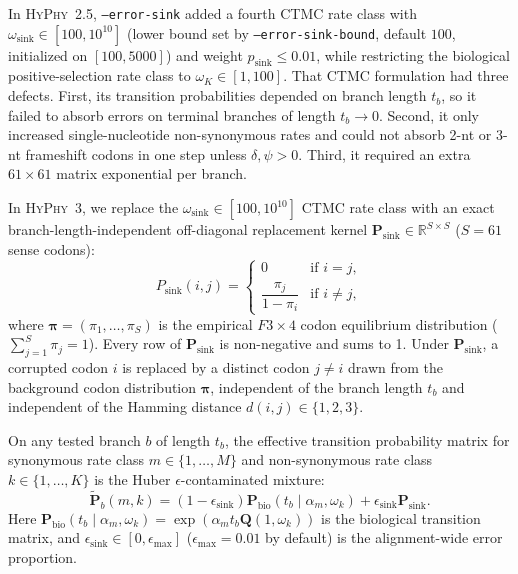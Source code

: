 \documentclass[11pt]{article}
\begin{document}
In \textsc{HyPhy}~2.5, \texttt{--error-sink} added a fourth CTMC rate class with $\omega_{\text{sink}} \in [100, 10^{10}]$ (lower bound set by \texttt{--error-sink-bound}, default $100$, initialized on $[100, 5000]$) and weight $p_{\text{sink}} \le 0.01$, while restricting the biological positive-selection rate class to $\omega_K \in [1, 100]$. That CTMC formulation had three defects. First, its transition probabilities depended on branch length $t_b$, so it failed to absorb errors on terminal branches of length $t_b \to 0$. Second, it only increased single-nucleotide non-synonymous rates and could not absorb 2-nt or 3-nt frameshift codons in one step unless $\delta, \psi > 0$. Third, it required an extra $61 \times 61$ matrix exponential per branch.

In \textsc{HyPhy}~3, we replace the $\omega_{\text{sink}} \in [100, 10^{10}]$ CTMC rate class with an exact branch-length-independent off-diagonal replacement kernel $\bm{P}_{\text{sink}} \in \mathbb{R}^{S \times S}$ ($S = 61$ sense codons):
\begin{equation}
    P_{\text{sink}}(i, j) = \begin{cases}
    0 & \text{if } i = j, \\
    \dfrac{\pi_j}{1 - \pi_i} & \text{if } i \neq j,
    \end{cases}
    \label{eq:psink}
\end{equation}
where $\bm{\pi} = (\pi_1, \dots, \pi_S)$ is the empirical $F3\times 4$ codon equilibrium distribution ($\sum_{j=1}^S \pi_j = 1$). Every row of $\bm{P}_{\text{sink}}$ is non-negative and sums to 1. Under $\bm{P}_{\text{sink}}$, a corrupted codon $i$ is replaced by a distinct codon $j \neq i$ drawn from the background codon distribution $\bm{\pi}$, independent of the branch length $t_b$ and independent of the Hamming distance $d(i, j) \in \{1, 2, 3\}$.

On any tested branch $b$ of length $t_b$, the effective transition probability matrix for synonymous rate class $m \in \{1, \dots, M\}$ and non-synonymous rate class $k \in \{1, \dots, K\}$ is the Huber $\epsilon$-contaminated mixture:
\begin{equation}
    \tilde{\bm{P}}_b(m, k) = (1 - \epsilon_{\text{sink}}) \bm{P}_{\text{bio}}(t_b \mid \alpha_m, \omega_k) + \epsilon_{\text{sink}} \bm{P}_{\text{sink}}.
    \label{eq:huber}
\end{equation}
Here $\bm{P}_{\text{bio}}(t_b \mid \alpha_m, \omega_k) = \exp(\alpha_m t_b \bm{Q}(1, \omega_k))$ is the biological transition matrix, and $\epsilon_{\text{sink}} \in [0, \epsilon_{\max}]$ ($\epsilon_{\max} = 0.01$ by default) is the alignment-wide error proportion.
\end{document}
